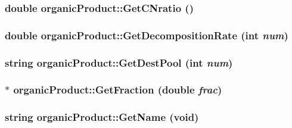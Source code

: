 \label{classorganic_product_a8017dbe0d08fdbc603c7e66c1aad6bb7}
\hypertarget{classorganic_product_abec5af127d3ff1f687ddec55f0d7a827}{
\subsubsection[{GetCNratio}]{\setlength{\rightskip}{0pt plus 5cm}double organicProduct::GetCNratio ()}}
\label{classorganic_product_abec5af127d3ff1f687ddec55f0d7a827}
\hypertarget{classorganic_product_ae45c737a922deb7c54c890d503d2ed26}{
\subsubsection[{GetDecompositionRate}]{\setlength{\rightskip}{0pt plus 5cm}double organicProduct::GetDecompositionRate (int {\em num})}}
\label{classorganic_product_ae45c737a922deb7c54c890d503d2ed26}
\hypertarget{classorganic_product_a819eb78c2c6ed351bdfc27264ea74281}{
\subsubsection[{GetDestPool}]{\setlength{\rightskip}{0pt plus 5cm}string organicProduct::GetDestPool (int {\em num})}}
\label{classorganic_product_a819eb78c2c6ed351bdfc27264ea74281}
\hypertarget{classorganic_product_ab9f2dcb358bab6290b9fc01af1992d74}{
\subsubsection[{GetFraction}]{ $\ast$ organicProduct::GetFraction (double {\em frac})}}
\label{classorganic_product_ab9f2dcb358bab6290b9fc01af1992d74}
\hypertarget{classorganic_product_a1ff3dd7c96d3d9fd7dee39aafc9cc0a5}{
\subsubsection[{GetName}]{\setlength{\rightskip}{0pt plus 5cm}string organicProduct::GetName (void)}}
\label{classorganic_product_a1ff3dd7c96d3d9fd7dee39aafc9cc0a5}


